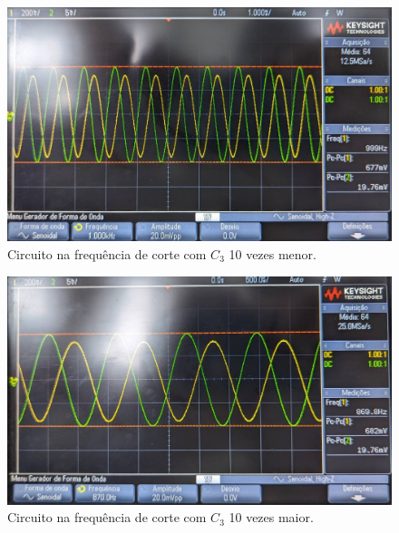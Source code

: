 \begin{figure}[H]
    \centering
    \includegraphics[width=0.5\columnwidth]{Images/freq_corte_C3_baixo.jpeg}
    \caption{Circuito na frequência de corte com $C_3$ 10 vezes menor.}
\end{figure}

\begin{figure}[H]
    \centering
    \includegraphics[width=0.5\columnwidth]{Images/freq_corte_C3_alto.jpeg}
    \caption{Circuito na frequência de corte com $C_3$ 10 vezes maior.}
\end{figure}